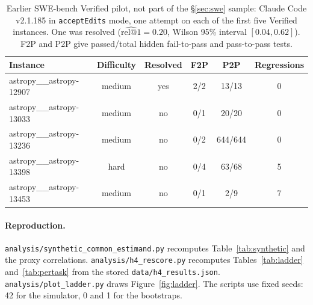 \documentclass[11pt,a4paper]{article}
\makeatletter
\newcommand{\relk}[1]{\mathrm{rel}@#1}
\makeatother
\begin{document}
\begin{table}[htbp]
  \centering
  \small
  \begin{tabularx}{\linewidth}{@{}X c c c c c@{}}
    \toprule
    Instance & Difficulty & Resolved & F2P & P2P & Regressions \\
    \midrule
    astropy\_\_astropy-12907 & medium & yes & 2/2 & 13/13 & 0 \\
    astropy\_\_astropy-13033 & medium & no & 0/1 & 20/20 & 0 \\
    astropy\_\_astropy-13236 & medium & no & 0/2 & 644/644 & 0 \\
    astropy\_\_astropy-13398 & hard & no & 0/4 & 63/68 & 5 \\
    astropy\_\_astropy-13453 & medium & no & 0/1 & 2/9 & 7 \\
    \bottomrule
  \end{tabularx}
  \caption{Earlier SWE-bench Verified pilot, not part of the \S\ref{sec:swe} sample: Claude Code v2.1.185 in \texttt{acceptEdits} mode, one attempt on each of the first five Verified instances. One was resolved ($\widehat{\relk{1}}=0.20$, Wilson 95\% interval $[0.04, 0.62]$). F2P and P2P give passed/total hidden fail-to-pass and pass-to-pass tests.}
  \label{tab:swe}
\end{table}

\paragraph{Reproduction.}
\nolinkurl{analysis/synthetic_common_estimand.py} recomputes Table~\ref{tab:synthetic} and the proxy correlations. \nolinkurl{analysis/h4_rescore.py} recomputes Tables~\ref{tab:ladder} and~\ref{tab:pertask} from the stored \nolinkurl{data/h4_results.json}. \nolinkurl{analysis/plot_ladder.py} draws Figure~\ref{fig:ladder}. The scripts use fixed seeds: 42 for the simulator, 0 and 1 for the bootstraps.
\end{document}
